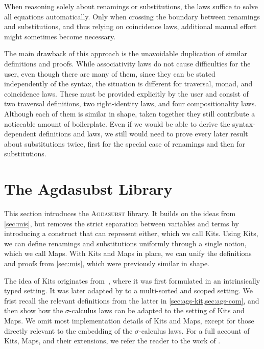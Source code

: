 \documentclass[screen,nonacm]{acmart}
\begin{document}
When reasoning solely about renamings or substitutions, the laws suffice to
solve all equations automatically. Only when crossing the boundary between
renamings and substitutions, and thus relying on coincidence laws, additional
manual effort might sometimes become necessary.

The main drawback of this approach is the unavoidable duplication of similar
definitions and proofs. While associativity laws do not cause difficulties for
the user, even though there are many of them, since they can be stated
independently of the syntax, the situation is different for traversal, monad,
and coincidence laws. These must be provided explicitly by the user and consist
of two traversal definitions, two right-identity laws, and four
compositionality laws. Although each of them is similar in shape, taken
together they still contribute a noticeable amount of boilerplate. Even if we
would be able to derive the syntax-dependent definitions and laws, we still
would need to prove every later result about substitutions twice, first for the
special case of renamings and then for substitutions.

\section{The Agdasubst Library}\label{sec:ags}
This section introduces the \textsc{Agdasubst} library. It builds on the ideas
from \cref{sec:mis}, but removes the strict separation between variables and
terms by introducing a construct that can represent either, which we call Kits.
Using Kits, we can define renamings and substitutions uniformly through a
single notion, which we call Maps. With Kits and Maps in place, we can unify
the definitions and proofs from \cref{sec:mis}, which were previously similar
in shape.

The idea of Kits originates from~\citet{ren-sub}, where it was first formulated
in an intrinsically typed setting. It was later adapted by
\citet{saffrich:LIPIcs.ITP.2024.32} to a multi-sorted and scoped setting. We
frist recall the relevant definitions from the latter in
\cref{sec:ags-kit,sec:ags-com}, and then show how the $\sigma$-calculus laws
can be adapted to the setting of Kits and Maps. We omit most implementation
details of Kits and Maps, except for those directly relevant to the embedding
of the $\sigma$-calculus laws. For a full account of Kits, Maps, and their
extensions, we refer the reader to the work of
\citeauthor{saffrich:LIPIcs.ITP.2024.32}.
\end{document}
